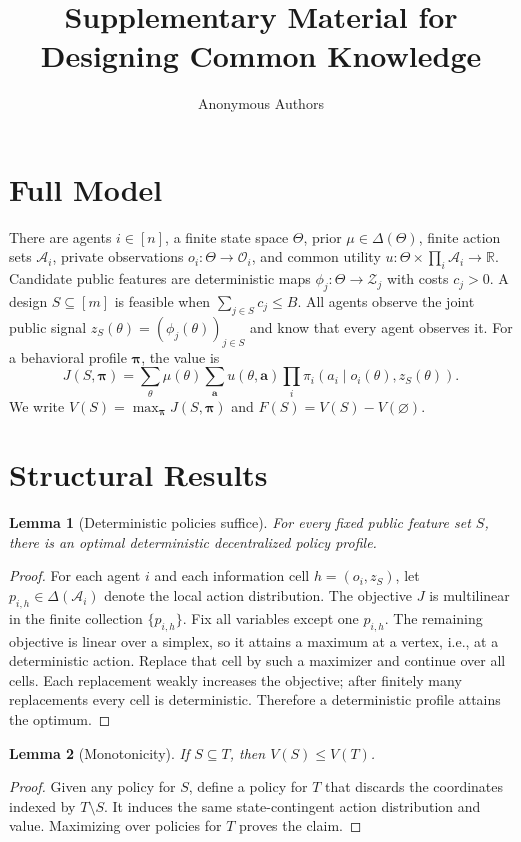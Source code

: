 \documentclass[11pt]{article}
\title{Supplementary Material for\\Designing Common Knowledge}
\author{Anonymous Authors}
\date{}
\newtheorem{lemma}{Lemma}
\newcommand{\calA}{\mathcal{A}}
\begin{document}
\maketitle

\section{Full Model}
There are agents $i\in[n]$, a finite state space $\Theta$, prior $\mu\in\Delta(\Theta)$, finite action sets $\calA_i$, private observations $o_i:\Theta\to\mathcal O_i$, and common utility $u:\Theta\times\prod_i\calA_i\to\mathbb R$. Candidate public features are deterministic maps $\phi_j:\Theta\to\mathcal Z_j$ with costs $c_j>0$. A design $S\subseteq[m]$ is feasible when $\sum_{j\in S}c_j\le B$. All agents observe the joint public signal $z_S(\theta)=(\phi_j(\theta))_{j\in S}$ and know that every agent observes it. For a behavioral profile $\boldsymbol\pi$, the value is
\[
J(S,\boldsymbol\pi)=\sum_{\theta}\mu(\theta)
 \sum_{\mathbf a}u(\theta,\mathbf a)
 \prod_i\pi_i(a_i\mid o_i(\theta),z_S(\theta)).
\]
We write $V(S)=\max_{\boldsymbol\pi}J(S,\boldsymbol\pi)$ and $F(S)=V(S)-V(\varnothing)$.

\section{Structural Results}

\begin{lemma}[Deterministic policies suffice]\label{lem:det}
For every fixed public feature set $S$, there is an optimal deterministic decentralized policy profile.
\end{lemma}
\begin{proof}
For each agent $i$ and each information cell $h=(o_i,z_S)$, let $p_{i,h}\in\Delta(\calA_i)$ denote the local action distribution. The objective $J$ is multilinear in the finite collection $\{p_{i,h}\}$. Fix all variables except one $p_{i,h}$. The remaining objective is linear over a simplex, so it attains a maximum at a vertex, i.e., at a deterministic action. Replace that cell by such a maximizer and continue over all cells. Each replacement weakly increases the objective; after finitely many replacements every cell is deterministic. Therefore a deterministic profile attains the optimum.
\end{proof}

\begin{lemma}[Monotonicity]\label{lem:mono}
If $S\subseteq T$, then $V(S)\le V(T)$.
\end{lemma}
\begin{proof}
Given any policy for $S$, define a policy for $T$ that discards the coordinates indexed by $T\setminus S$. It induces the same state-contingent action distribution and value. Maximizing over policies for $T$ proves the claim.
\end{proof}
\end{document}
